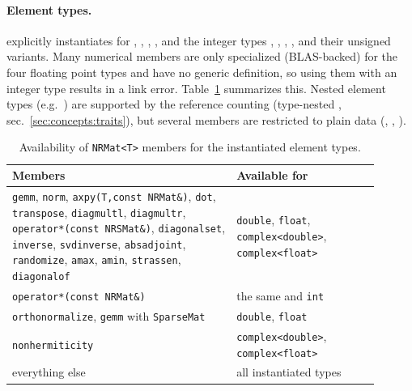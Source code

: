 \paragraph{Element types.}  explicitly instantiates  for
, , , , and the integer types , , ,
,  and their unsigned variants. Many numerical members are only
specialized (BLAS-backed) for the four floating point types and have no generic
definition, so using them with an integer type results in a link error. Table~\ref{tab:mat:types}
summarizes this. Nested element types (e.g.\ ) are supported by the
reference counting (type-nested , sec.~\ref{sec:concepts:traits}), but several
members are restricted to plain data (,
, ).

\begin{table}[htbp]
\centering\small
\begin{tabular}{>{\raggedright\arraybackslash}p{0.55\linewidth}>{\raggedright\arraybackslash}p{0.35\linewidth}}
\toprule
Members & Available for \\
\midrule
\texttt{gemm}, \texttt{norm}, \texttt{axpy(T,const NRMat\&)}, \texttt{dot}, \texttt{transpose}, \texttt{diagmultl}, \texttt{diagmultr},
\texttt{operator*(const NRSMat\&)}, \texttt{diagonalset}, \texttt{inverse}, \texttt{svdinverse}, \texttt{absadjoint},
\texttt{randomize}, \texttt{amax}, \texttt{amin}, \texttt{strassen}, \texttt{diagonalof} & \texttt{double}, \texttt{float}, \texttt{complex<double>}, \texttt{complex<float>} \\
\texttt{operator*(const NRMat\&)} & the same and \texttt{int} \\
\texttt{orthonormalize}, \texttt{gemm} with \texttt{SparseMat} & \texttt{double}, \texttt{float} \\
\texttt{nonhermiticity} & \texttt{complex<double>}, \texttt{complex<float>} \\
everything else & all instantiated types \\
\bottomrule
\end{tabular}
\caption{Availability of \texttt{NRMat<T>} members for the instantiated element types.}\label{tab:mat:types}
\end{table}

